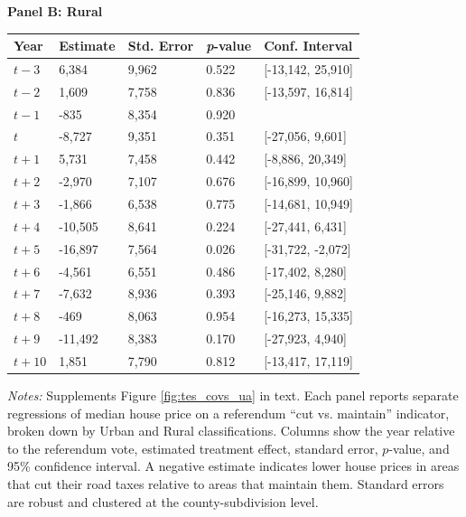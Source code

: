 \begin{table}[htbp]
\begin{threeparttable}
    \centering
    \textbf{Panel B: Rural} \\[4pt]
    \begin{tabularx}{\textwidth}{l*{4}{X}}
    \hline
    \textbf{Year} & \textbf{Estimate} & \textbf{Std. Error} & \textbf{\textit{p}-value} & \textbf{Conf. Interval} \\
    \hline
    $t - 3$  & 6,384  & 9,962  & 0.522 & [-13,142, 25,910] \\
    $t - 2$  & 1,609  & 7,758  & 0.836 & [-13,597, 16,814] \\
    $t - 1$  & -835   & 8,354  & 0.920 &  \\
    $t$  & -8,727 & 9,351  & 0.351 & [-27,056, 9,601] \\
    $t + 1$  & 5,731  & 7,458  & 0.442 & [-8,886, 20,349] \\
    $t + 2$  & -2,970 & 7,107  & 0.676 & [-16,899, 10,960] \\
    $t + 3$  & -1,866 & 6,538  & 0.775 & [-14,681, 10,949] \\
    $t + 4$  & -10,505 & 8,641 & 0.224 & [-27,441, 6,431] \\
    $t + 5$  & -16,897 & 7,564 & 0.026 & [-31,722, -2,072] \\
    $t + 6$  & -4,561 & 6,551  & 0.486 & [-17,402, 8,280] \\
    $t + 7$  & -7,632 & 8,936  & 0.393 & [-25,146, 9,882] \\
    $t + 8$  & -469   & 8,063  & 0.954 & [-16,273, 15,335] \\
    $t + 9$  & -11,492 & 8,383 & 0.170 & [-27,923, 4,940] \\
    $t + 10$ & 1,851  & 7,790  & 0.812 & [-13,417, 17,119] \\
    \hline
    \end{tabularx}
    
    \begin{tablenotes}[flushleft]
    \small
    \item \textit{Notes:} Supplements Figure \ref{fig:tes_covs_ua} in text. Each panel reports separate regressions of median house price on a referendum “cut vs. maintain” indicator, broken down by Urban and Rural classifications. Columns show the year relative to the referendum vote, estimated treatment effect, standard error, \(p\)-value, and 95\% confidence interval. A negative estimate indicates lower house prices in areas that cut their road taxes relative to areas that maintain them. Standard errors are robust and clustered at the county-subdivision level.
    \end{tablenotes}
    \end{threeparttable}
\end{table}

